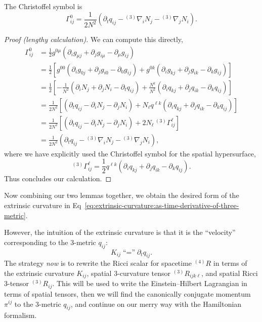 \begin{lemma}
  The Christoffel symbol is
  \begin{equation}
\Gamma^{0}_{ij} = \frac{1}{2N^{2}}(\partial_{t}q_{ij} - {{}^{(3)}}\nabla_{i}N_{j} - {{}^{(3)}}\nabla_{j}N_{i}).
  \end{equation}
\end{lemma}
\begin{proof}[Proof (lengthy calculation)]
  We can compute this directly,
  \begin{subequations}
    \begin{align}
\Gamma^{0}_{ij} &= \frac{1}{2} g^{0\mu}(\partial_{i}g_{\mu j} + \partial_{j}g_{i\mu} - \partial_{\mu} g_{ij}) \\
        &= \frac{1}{2}\left[ g^{00}(\partial_{i}g_{0j} + \partial_{j}g_{i0} - \partial_{0} g_{ij}) + g^{0k}(\partial_{i}g_{kj} + \partial_{j}g_{ik} - \partial_{k} g_{ij})  \right] \\
        &= \frac{1}{2}\left[ -\frac{1}{N^{2}} (\partial_{i}N_{j}+ \partial_{j}N_{i}- \partial_{t} q_{ij}) + \frac{N^{k}}{N^{2}} (\partial_{i}q_{kj} + \partial_{j}q_{ik} - \partial_{k} q_{ij}) \right] \\
        &= \frac{1}{2N^{2}}\left[ (\partial_{t} q_{ij} - \partial_{i}N_{j}- \partial_{j}N_{i}) + N_{\ell} q^{\ell k} (\partial_{i}q_{kj} + \partial_{j}q_{ik} - \partial_{k} q_{ij}) \right] \\
        &= \frac{1}{2N^{2}}\left[ (\partial_{t} q_{ij} - \partial_{i} N_{j} - \partial_{j}N_{i}) + 2 N_{\ell} \,{{}^{(3)}}\Gamma^{\ell}_{ij} \right] \\
        &= \frac{1}{2N^{2}} \left(\partial_{t} q_{ij} - {{}^{(3)}\nabla}_{i}N_{j}- {{}^{(3)}\nabla}_{j}N_{i}\right),
    \end{align}
  \end{subequations}
  where we have explicitly used the Christoffel symbol for the spatial hypersurface,
  \begin{equation}
    {{}^{(3)}}\Gamma^{\ell}_{ij} = \frac{1}{2}q^{\ell k}(\partial_{i}q_{kj} + \partial_{j}q_{ik} - \partial_{k}q_{ij}).
  \end{equation}
  Thus concludes our calculation.
\end{proof}

Now combining our two lemmas together, we obtain the desired form of the
extrinsic curvature in Eq~\eqref{eq:extrinsic-curvature:as-time-derivative-of-three-metric}.

However, the intuition of the extrinsic curvature is that it is the
``velocity'' corresponding to the 3-metric $q_{ij}$:
\begin{equation}
\boxed{K_{ij}\mathrel{\mbox{``=''}}\partial_{t}q_{ij}.}
\end{equation}
The strategy
\emph{now} is to rewrite the Ricci scalar for spacetime ${}^{(4)}R$ in
terms of the extrinsic curvature $K_{ij}$, spatial 3-curvature tensor
${}^{(3)}R_{ijk\ell}$, and spatial Ricci 3-tensor ${}^{(3)}R_{ij}$. This
will be used to write the Einstein--Hilbert Lagrangian in terms of
spatial tensors, then we will find the canonically conjugate momentum
$\pi^{ij}$ to the 3-metric $q_{ij}$, and continue on our merry way with
the Hamiltonian formalism.

